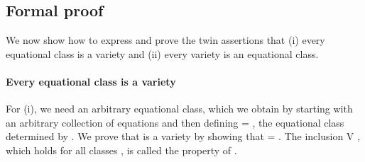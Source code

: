 \subsection{Formal proof}
We now show how to express and prove the twin assertions that
(i) every equational class is a variety and (ii) every variety is an equational class.

\paragraph*{Every equational class is a variety}
For (i), we need an arbitrary equational class, which we obtain by starting with an arbitrary
collection  of equations and then defining  =  , the equational class
determined by . We prove that  is a variety by showing that
 =  . The inclusion   \af V , which holds for all
classes , is called the  property of .

